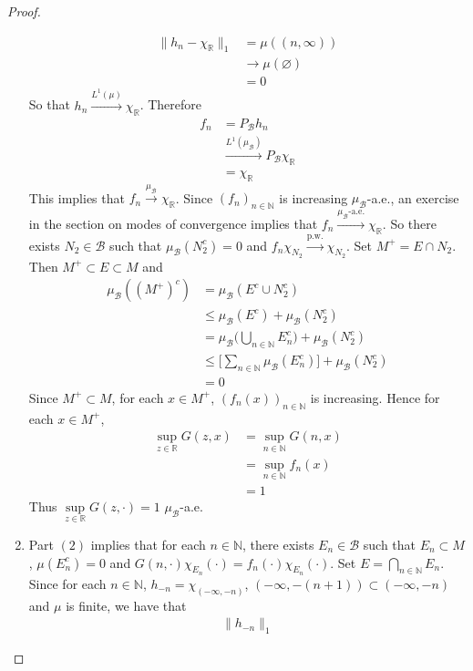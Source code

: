 \documentclass[12pt]{amsart}
\theoremstyle{definition}
\newcommand{\N}{\mathbb{N}}
\newcommand{\R}{\mathbb{R}}
\newcommand{\MB}{\mathcal{B}}
\newcommand{\convt}[1]{\xrightarrow{\text{#1}}}
\newcommand{\conv}[1]{\xrightarrow{#1}}
\begin{document}
\begin{proof}
\begin{enumerate}
			\begin{align*}
				\|h_n - \chi_{\R}\|_1
				& = \mu((n, \infty)) \\
				& \rightarrow \mu(\varnothing) \\
				& = 0 
			\end{align*}
			So that $h_{n} \conv{L^1(\mu)} \chi_{\R}$. Therefore  
			\begin{align*}
				f_n 
				& = P_{\MB} h_n \\
				& \conv{L^1(\mu_{\MB})} P_{\MB} \chi_{\R} \\
				& = \chi_{\R}
			\end{align*}
			This implies that $f_n \conv{\mu_{\MB}} \chi_{\R}$. Since $(f_n)_{n \in \N}$ is increasing $\mu_{\MB}$-a.e., an exercise in the section on modes of convergence implies that $f_n \convt{$\mu_{\MB}$-a.e.} \chi_{\R}$. So there exists $N_2 \in \MB$ such that $\mu_{\MB}(N_2^c) = 0$ and $f_n \chi_{N_2} \convt{p.w.} \chi_{N_2}$. Set $M^+ = E \cap N_2$. Then  $M^+ \subset E \subset M$ and
			\begin{align*}
				\mu_{\MB}((M^+)^c)
				& = \mu_{\MB}(E^c \cup N_2^c) \\ 
				& \leq \mu_{\MB}(E^c) + \mu_{\MB}(N_2^c) \\
				& = \mu_{\MB} \bigg( \bigcup_{n \in \N} E_n^c \bigg) + \mu_{\MB}(N_2^c) \\
				& \leq \bigg[\sum_{n \in \N} \mu_{\MB}(E_n^c) \bigg] + \mu_{\MB}(N_2^c) \\
				& = 0
			\end{align*}
			Since $M^+ \subset M$, for each $x \in M^+$, $(f_n(x))_{n \in \N}$ is increasing. Hence for each $x \in M^+$,
			\begin{align*}
				\sup\limits_{z \in \R} G(z, x) 
				& = \sup\limits_{n \in \N} G(n, x) \\
				& = \sup\limits_{n \in \N} f_n(x) \\
				& = 1
			\end{align*}
			Thus $\sup\limits_{z \in \R} G(z, \cdot) = 1$ $\mu_{\MB}$-a.e.\\
		\item Part $(2)$ implies that for each $n \in \N$, there exists $E_n \in \MB$ such that $E_n \subset M$, $\mu(E_n^c) = 0$ and $G(n, \cdot)\chi_{E_n}(\cdot) = f_n(\cdot) \chi_{E_n}(\cdot)$. Set $E = \bigcap\limits_{n \in \N} E_n$. Since for each $n \in \N$, $h_{-n} = \chi_{(-\infty, -n)}$, $(-\infty, -(n + 1)) \subset (-\infty, -n)$ and $\mu$ is finite, we have that 
		\begin{align*}
			\|h_{-n}\|_1

\end{align*}
\end{enumerate}
\end{proof}
\end{document}

